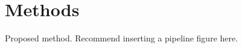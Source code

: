 \section{Methods}
\label{subsec:methods}

Proposed method. Recommend inserting a pipeline figure here.
